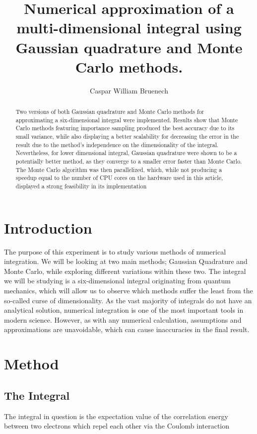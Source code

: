 \documentclass[a4paper,10pt,english]{article}
\title{Numerical approximation of a multi-dimensional integral using Gaussian quadrature and Monte Carlo methods.}
\author{Caspar William Bruenech}
\begin{document}
\maketitle

\begin{abstract} \centering
    Two versions of both Gaussian quadrature and Monte Carlo methods for approximating a six-dimensional integral were implemented. Results show that Monte Carlo methods featuring importance sampling produced the best accuracy due to its small variance, while also displaying a better scalability for decreasing the error in the result due to the method's independence on the dimensionality of the integral. Nevertheless, for lower dimensional integral, Gaussian quadrature were shown to be a potentially better method, as they converge to a smaller error faster than Monte Carlo. The Monte Carlo algorithm was then parallelized, which, while not producing a speedup equal to the number of CPU cores on the hardware used in this article, displayed a strong feasibility in its implementation
\end{abstract}

\section{Introduction}

The purpose of this experiment is to study various methods of numerical integration. We will be looking at two main methods; Gaussian Quadrature and Monte Carlo, while exploring different variations within these two. The integral we will be studying is a six-dimensional integral originating from quantum mechanics, which will allow us to observe which methods suffer the least from the so-called curse of dimensionality. As the vast majority of integrals do not have an analytical solution, numerical integration is one of the most important tools in modern science. However, as with any numerical calculation, assumptions and approximations are unavoidable, which can cause inaccuracies in the final result. 

\section{Method}

\subsection{The Integral}

The integral in question is the expectation value of the correlation energy between two electrons which repel each other via the Coulomb interaction
\end{document}

